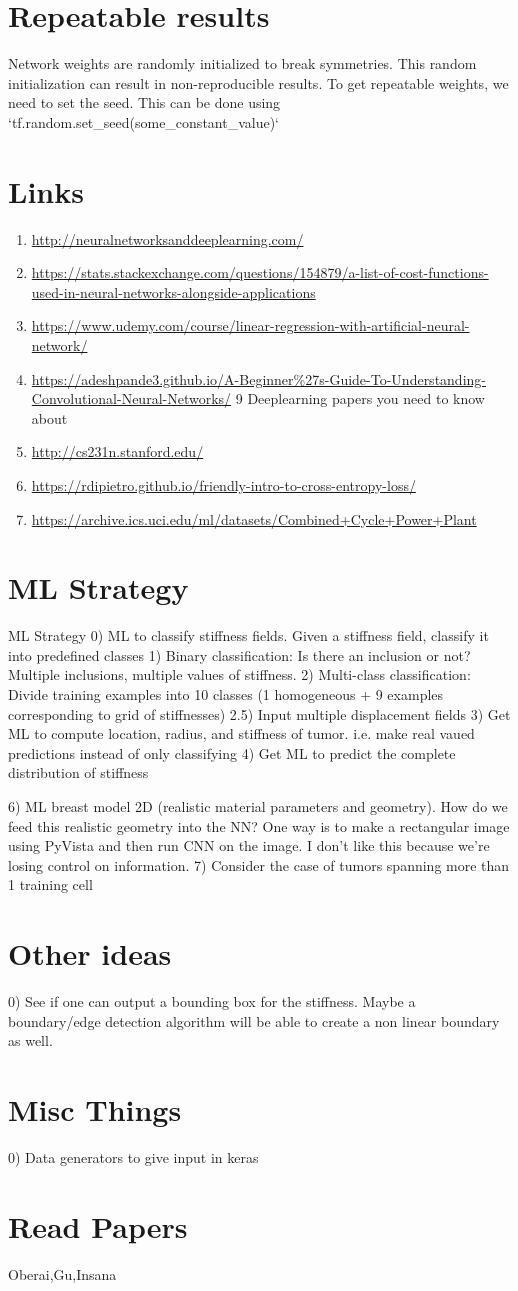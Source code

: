 \documentclass{article}
\begin{document}
\section{Repeatable results}
Network weights are randomly initialized to break symmetries. This random initialization can result in non-reproducible results. To get repeatable weights, we need to set the seed. This can be done using `tf.random.set\_seed(some\_constant\_value)`
\section{Links}
\begin{enumerate}
\item{\url{http://neuralnetworksanddeeplearning.com/}}
\item{\url{https://stats.stackexchange.com/questions/154879/a-list-of-cost-functions-used-in-neural-networks-alongside-applications}}
\item{\url{https://www.udemy.com/course/linear-regression-with-artificial-neural-network/}}
\item{\url{https://adeshpande3.github.io/A-Beginner%27s-Guide-To-Understanding-Convolutional-Neural-Networks/} 9 Deeplearning  papers you need to know about}
\item{\url{http://cs231n.stanford.edu/} }
\item{\url{https://rdipietro.github.io/friendly-intro-to-cross-entropy-loss/}}
\item{\url{https://archive.ics.uci.edu/ml/datasets/Combined+Cycle+Power+Plant}}
\end{enumerate}
\section{ML Strategy}
ML Strategy
0) ML to classify stiffness fields. Given a stiffness field, classify it into predefined classes
1) Binary classification: Is there an inclusion or not? Multiple inclusions, multiple values of stiffness. 
2) Multi-class classification: Divide training examples into 10 classes (1 homogeneous + 9 examples corresponding to grid of stiffnesses)
2.5) Input multiple displacement fields
3) Get ML to compute location, radius, and stiffness of tumor. i.e. make real vaued predictions instead of only classifying
4) Get ML to predict the complete distribution of stiffness

6) ML breast model 2D (realistic material parameters and geometry). How do we feed this realistic geometry into the NN? One way is to make a rectangular image using PyVista and then run CNN on the image. I don't like this because we're losing control on information.  
7) Consider the case of tumors spanning more than 1 training cell
\section{Other ideas}
0) See if one can output a bounding box for the stiffness. Maybe a boundary/edge detection algorithm will be able to create a non linear boundary as well.
\section{Misc Things}
0) Data generators to give input in keras
\section{Read Papers}
{Oberai,Gu,Insana}
\end{document}
